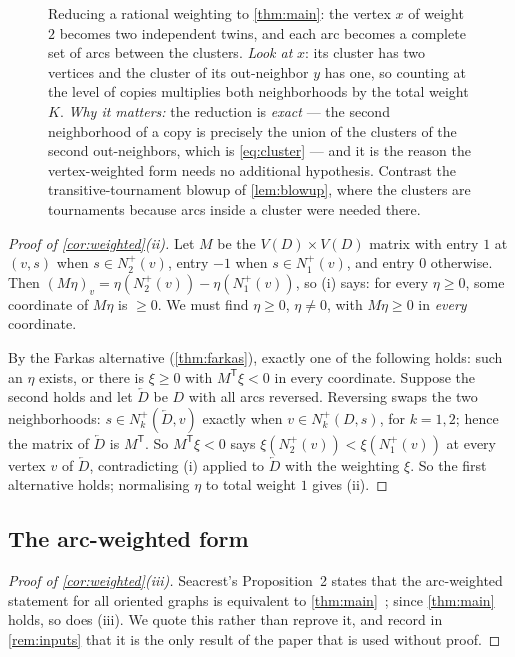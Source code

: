\begin{figure}[t]
\centering

\caption{Reducing a rational weighting to \cref{thm:main}: the vertex $x$ of weight $2$ becomes two
 independent twins, and each arc becomes a complete set of arcs between the clusters.
 \emph{Look at} $x$: its cluster has two vertices and the cluster of its out-neighbor $y$ has one, so
 counting at the level of copies multiplies both neighborhoods by the total weight $K$.
 \emph{Why it matters:} the reduction is \emph{exact} --- the second neighborhood of a copy is
 precisely the union of the clusters of the second out-neighbors, which is
 \eqref{eq:cluster} --- and it is the reason the vertex-weighted form needs no additional
 hypothesis. Contrast the transitive-tournament blowup of \cref{lem:blowup}, where the clusters are
 tournaments because arcs inside a cluster were needed there.}
\label{fig:weightblowup}
\end{figure}

\begin{proof}[Proof of \cref{cor:weighted}(ii)]
Let $M$ be the $V(D)\times V(D)$ matrix with entry $1$ at $(v,s)$ when $s\in N_2^+(v)$, entry $-1$
when $s\in N_1^+(v)$, and entry $0$ otherwise. Then $(M\eta)_v=\eta(N_2^+(v))-\eta(N_1^+(v))$, so
(i) says: for every $\eta\ge0$, some coordinate of $M\eta$ is $\ge0$. We must find $\eta\ge0$,
$\eta\ne0$, with $M\eta\ge0$ in \emph{every} coordinate.

By the Farkas alternative (\cref{thm:farkas}), exactly one of the following holds: such an $\eta$
exists, or there is $\xi\ge0$ with $M^{\mathsf T}\xi<0$ in every coordinate. Suppose the second
holds and let $\overleftarrow D$ be $D$ with all arcs reversed. Reversing swaps the two
neighborhoods: $s\in N_k^+(\overleftarrow D,v)$ exactly when $v\in N_k^+(D,s)$, for $k=1,2$; hence
the matrix of $\overleftarrow D$ is $M^{\mathsf T}$. So $M^{\mathsf T}\xi<0$ says
$\xi(N_2^+(v))<\xi(N_1^+(v))$ at every vertex $v$ of $\overleftarrow D$, contradicting (i) applied to
$\overleftarrow D$ with the weighting $\xi$. So the first alternative holds; normalising $\eta$ to
total weight $1$ gives (ii).
\end{proof}

\subsection{The arc-weighted form}\label{sec:arc-weighted}

\begin{proof}[Proof of \cref{cor:weighted}(iii)]
Seacrest's Proposition~2 states that the arc-weighted statement for all oriented graphs is equivalent
to \cref{thm:main}~\cite{Seacrest2015}; since \cref{thm:main} holds, so does (iii). We quote this
rather than reprove it, and record in \cref{rem:inputs} that it is the only result of the paper that
is used without proof.
\end{proof}

